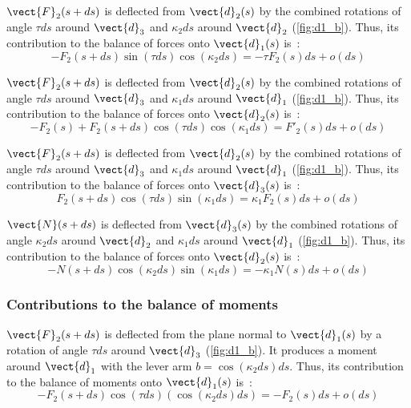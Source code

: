 $\vect{F}_2(s+ds)$ is deflected from $\vect{d}_2(s)$ by the combined rotations of angle $\tau ds$ around $\vect{d}_3$ and $\kappa_2 ds$ around $\vect{d}_2$ (\cref{fig:d1_b}). Thus, its contribution to the balance of forces onto $\vect{d}_1(s)$ is~:
\begin{equation*}
	-F_2(s+ds) \sin(\tau ds) \cos(\kappa_2 ds) = -\tau F_2(s) ds + o(ds)
\end{equation*}

$\vect{F}_2(s+ds)$ is deflected from $\vect{d}_2(s)$ by the combined rotations of angle $\tau ds$ around $\vect{d}_3$ and $\kappa_1 ds$ around $\vect{d}_1$ (\cref{fig:d1_b}). Thus, its contribution to the balance of forces onto $\vect{d}_2(s)$ is~:
\begin{equation*}
	-F_2(s) + F_2(s+ds) \cos(\tau ds) \cos(\kappa_1 ds) = F'_2 (s) ds + o(ds)
\end{equation*}

$\vect{F}_2(s+ds)$ is deflected from $\vect{d}_2(s)$ by the combined rotations of angle $\tau ds$ around $\vect{d}_3$ and $\kappa_1 ds$ around $\vect{d}_1$ (\cref{fig:d1_b}). Thus, its contribution to the balance of forces onto $\vect{d}_3(s)$ is~:
\begin{equation*}
	F_2(s+ds) \cos(\tau ds) \sin(\kappa_1 ds) = \kappa_1 F_2(s) ds + o(ds)
\end{equation*}

$\vect{N}(s+ds)$ is deflected from $\vect{d}_3(s)$ by the combined rotations of angle $\kappa_2 ds$ around $\vect{d}_2$ and $\kappa_1 ds$ around $\vect{d}_1$ (\cref{fig:d1_b}). Thus, its contribution to the balance of forces onto $\vect{d}_2(s)$ is~:
\begin{equation*}
	-N(s+ds) \cos(\kappa_2 ds) \sin(\kappa_1 ds) = -\kappa_1 N(s) ds + o(ds)
\end{equation*}

\subsubsection{Contributions to the balance of moments}

$\vect{F}_2(s+ds)$ is deflected from the plane normal to $\vect{d}_1(s)$ by a rotation of angle $\tau ds$ around $\vect{d}_3$ (\cref{fig:d1_b}). It produces a moment around $\vect{d}_1$ with the lever arm $b =  \cos(\kappa_2 ds) ds$. Thus, its contribution to the balance of moments onto $\vect{d}_1(s)$ is~:
\begin{equation*}
	-F_2(s+ds) \cos(\tau ds) (\cos(\kappa_2 ds) ds) = -F_2(s) ds + o(ds)
\end{equation*}

